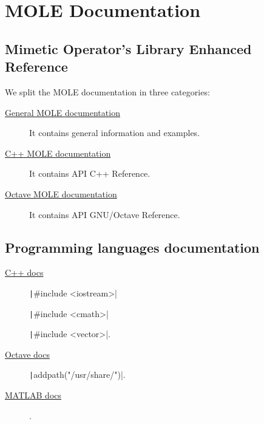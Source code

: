 \chapter{MOLE Documentation}

\section{Mimetic Operator's Library Enhanced Reference}

We split the MOLE documentation in three categories:

\begin{description}
	\item[\href{https://carlosal1015.github.io/mole_examples/html}{General MOLE documentation}]

	      It contains general information and examples.

	\item[\href{https://carlosal1015.github.io/mole_examples/doxygen/cpp/html}{C++ MOLE documentation}]

	      It contains API C++ Reference.

	\item[\href{https://carlosal1015.github.io/mole_examples/doxygen/matlab}{Octave MOLE documentation}]

	      It contains API GNU/Octave Reference.
\end{description}

\section{Programming languages documentation}

\begin{description}
	\item[\href{https://en.cppreference.com}{C++ docs}]

	      \texttt|#include <iostream>|

	      \texttt|#include <cmath>|

	      \texttt|#include <vector>|.

	\item[\href{https://docs.octave.org}{Octave docs}]

	      \texttt|addpath("/usr/share/")|.

	\item[\href{https://www.mathworks.com/help/matlab/index.html}{MATLAB docs}]

	      .
\end{description}

